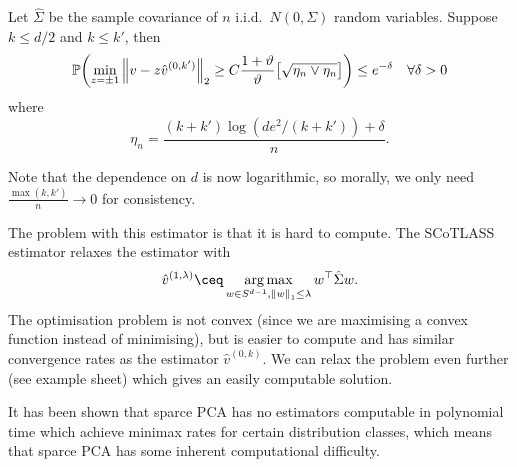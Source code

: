 \begin{proposition}
	Let $\hat\Sigma$ be the sample covariance of $n$ i.i.d.\ $N(0, \Sigma)$ random variables. Suppose $k \leq d/2$ and $k \leq k'$, then 
	\[
	\mathbb P\qty(\min_{z = \pm 1} \norm{v - z\hat v^{(0, k')}}_2 \geq  C\frac{1+\vartheta}{\vartheta} \qty[ \sqrt{\eta_n \lor \eta_n}]) \leq e^{-\delta} \quad\forall \delta > 0
	\]
	where 
	\[
	\eta_n = \frac{(k + k') \log(de^2/(k+ k')) + \delta}{n}.
	\]
\end{proposition}
Note that the dependence on $d$ is now logarithmic, so morally, we only need $\frac{\max(k, k')}{n} \to 0$ for consistency. 

The problem with this estimator is that it is hard to compute. The SCoTLASS estimator relaxes the estimator with 
\[
\hat v^{(1, \lambda)} \ceq \argmax_{w \in S^{d-1}, \norm{w}_1 \leq \lambda} w\T \hat\Sigma w.
\]
The optimisation problem is not convex (since we are maximising a convex function instead of minimising), but is easier to compute and has similar convergence rates as the estimator $\hat v^{(0, k)}$. We can relax the problem even further (see example sheet) which gives an easily computable solution. 

It has been shown that sparce PCA has no estimators computable in polynomial time which achieve minimax rates for certain distribution classes, which means that sparce PCA has some inherent computational difficulty. 